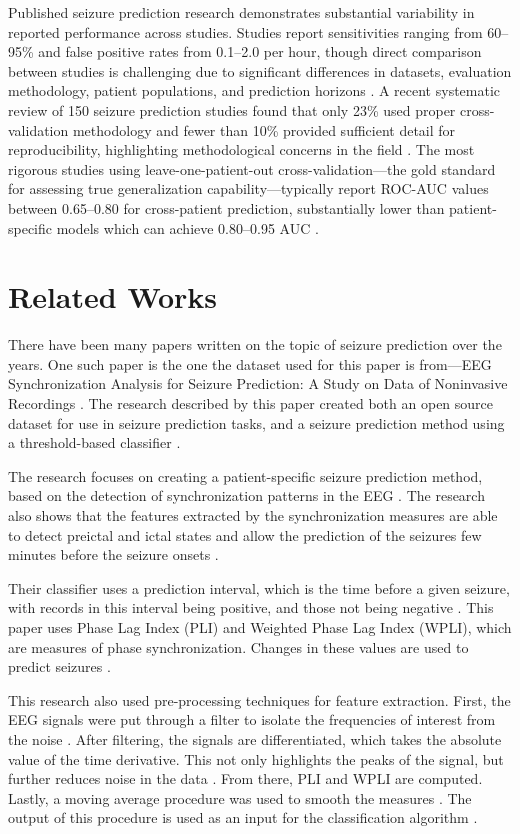 \documentclass[conference]{IEEEtran}
\begin{document}
Published seizure prediction research demonstrates substantial variability in reported performance across studies. Studies report sensitivities ranging from 60--95\% and false positive rates from 0.1--2.0 per hour, though direct comparison between studies is challenging due to significant differences in datasets, evaluation methodology, patient populations, and prediction horizons \cite{b13}. A recent systematic review of 150 seizure prediction studies found that only 23\% used proper cross-validation methodology and fewer than 10\% provided sufficient detail for reproducibility, highlighting methodological concerns in the field \cite{b14}. The most rigorous studies using leave-one-patient-out cross-validation---the gold standard for assessing true generalization capability---typically report ROC-AUC values between 0.65--0.80 for cross-patient prediction, substantially lower than patient-specific models which can achieve 0.80--0.95 AUC \cite{b15}.

\section*{Related Works}
There have been many papers written on the topic of seizure prediction over the years. One such paper is the one the dataset used for this paper is from---EEG Synchronization Analysis for Seizure Prediction: A Study on Data of Noninvasive Recordings \cite{b10}. The research described by this paper created both an open source dataset for use in seizure prediction tasks, and a seizure prediction method using a threshold-based classifier \cite{b10}.

The research focuses on creating a patient-specific seizure prediction method, based on the detection of synchronization patterns in the EEG \cite{b10}. The research also shows that the features extracted by the synchronization measures are able to detect preictal and ictal states and allow the prediction of the seizures few minutes before the seizure onsets \cite{b10}.

Their classifier uses a prediction interval, which is the time before a given seizure, with records in this interval being positive, and those not being negative \cite{b10}. This paper uses Phase Lag Index (PLI) and Weighted Phase Lag Index (WPLI), which are measures of phase synchronization. Changes in these values are used to predict seizures \cite{b10}.

This research also used pre-processing techniques for feature extraction. First, the EEG signals were put through a filter to isolate the frequencies of interest from the noise \cite{b10}. After filtering, the signals are differentiated, which takes the absolute value of the time derivative. This not only highlights the peaks of the signal, but further reduces noise in the data \cite{b10}. From there, PLI and WPLI are computed. Lastly, a moving average procedure was used to smooth the measures \cite{b10}. The output of this procedure is used as an input for the classification algorithm \cite{b10}.
\end{document}
